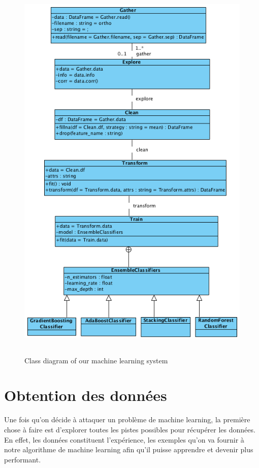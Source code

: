 \documentclass[12pt, french]{report}
\begin{document}
\begin{figure}[p]
\includegraphics[width=13cm, height=19cm]{images/MLClassDiag.png}
\caption{Class diagram of our machine learning system}
\label{MLClassDiag}
\end{figure}
\newpage


\section{Obtention des données}
Une fois qu'on décide à attaquer un problème de machine learning, la première chose à faire est d'explorer toutes les pistes possibles pour récupérer les données. En effet, les données constituent l'expérience, les exemples qu'on va fournir à notre algorithme de machine learning afin qu'il puisse apprendre et devenir plus performant.\\ 
\end{document}
